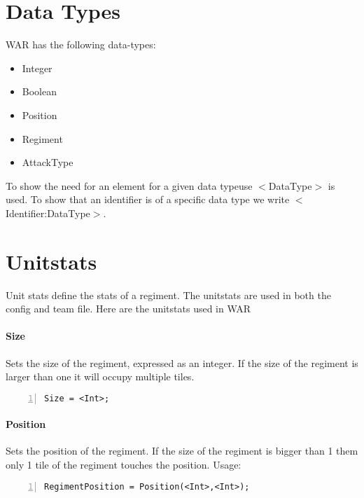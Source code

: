 \section{Data Types}
	WAR has the following data-types: \\
	\begin{itemize}
		\item Integer
		\item Boolean
		\item Position
		\item Regiment
		\item AttackType
	\end{itemize}
	To show the need for an element for a given data typeuse $<$DataType$>$ is used.
	To show that an identifier is of a specific data type we write $<$Identifier:DataType$>$.

\section{Unitstats}
	Unit stats define the stats of a regiment. The unitstats are used in both the config and team file. Here are the unitstats used in WAR
		\paragraph{Size}
			Sets the size of the regiment, expressed as an integer.
			If the size of the regiment is larger than one it will occupy multiple tiles.

\begin{lstlisting}[basicstyle=\small\sffamily,
keywordstyle={\color{blue}},
comment={[l]{//}}, morecomment={[s]{/*}{*/}}, commentstyle=\itshape,
columns={[l]flexible}, numbers=left, numberstyle=\tiny,
frameround=fftt, frame=shadowbox, captionpos=b,
caption={Size of a regiment}]
Size = <Int>;
\end{lstlisting}
		\paragraph{Position}
			Sets the position of the regiment. If the size of the regiment is bigger than 1 them 
			only 1 tile of the regiment touches the position. Usage: 

\begin{lstlisting}[basicstyle=\small\sffamily,
keywordstyle={\color{blue}},
comment={[l]{//}}, morecomment={[s]{/*}{*/}}, commentstyle=\itshape,
columns={[l]flexible}, numbers=left, numberstyle=\tiny,
frameround=fftt, frame=shadowbox, captionpos=b,
caption={Position of the regiment}]
RegimentPosition = Position(<Int>,<Int>);
\end{lstlisting}
